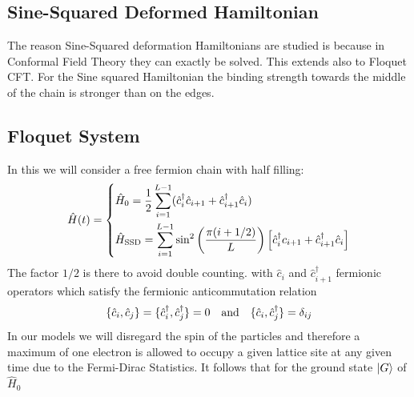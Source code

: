 \documentclass[11pt, a4paper]{article}
\theoremstyle{definition} %
\begin{document}
	\subsection{Sine-Squared Deformed Hamiltonian}
	
	
	
	
	The reason Sine-Squared deformation Hamiltonians are studied is because in Conformal Field Theory they can exactly be solved. This extends also to Floquet CFT. For the Sine squared Hamiltonian the binding strength towards the middle of the chain is stronger than on the edges. 
	
	\subsection{Floquet System}
	In this we will consider a free fermion chain with half filling:
	\begin{equation}
	\hat{H}(t) = 
		\begin{dcases}
		\hat{H}_0 = \frac{1}{2} \sum_{i=1}^{L-1} (\hat{c}_i^\dagger \hat{c}_{i+1} + \hat{c}_{i+1}^\dagger \hat{c}_{i})\\
		\hat{H}_\text{SSD} = \sum_{i=1}^{L-1} \sin^2\left( \frac{\pi(i + 1/2)}{L}\right) \left[ \hat{c}_i^\dagger c_{i+1} + \hat{c}_{i+1}^\dagger \hat{c}_i \right]
		\end{dcases}
	\end{equation}
	The factor $1/2$ is there to avoid double counting.
	with $\hat{c}_i$ and $\hat{c}_{i+1}^\dagger$ fermionic operators which satisfy the fermionic anticommutation relation
	\begin{equation}
		\{ \hat{c}_i, \hat{c}_j\} = \{\hat{c}_i^\dagger, \hat{c}_j^\dagger\} = 0 \qq{and} \{ \hat{c}_i, \hat{c}_j^\dagger \} = \delta_{ij}
	\end{equation}
	In our models we will disregard the spin of the particles and therefore a maximum of one electron is allowed to occupy a given lattice site at any given time due to the Fermi-Dirac Statistics. It follows that for the ground state $\ket{G}$ of $\hat{H}_0$ \\
\end{document}
